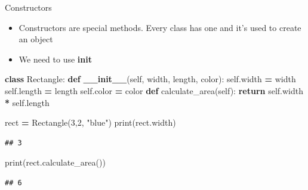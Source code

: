 \documentclass[
  8pt,
  ignorenonframetext,
]{beamer}
\newenvironment{Shaded}{\begin{snugshade}}{\end{snugshade}}
\newcommand{\BuiltInTok}[1]{#1}
\newcommand{\ControlFlowTok}[1]{\textcolor[rgb]{0.13,0.29,0.53}{\textbf{#1}}}
\newcommand{\DecValTok}[1]{\textcolor[rgb]{0.00,0.00,0.81}{#1}}
\newcommand{\FunctionTok}[1]{\textcolor[rgb]{0.13,0.29,0.53}{\textbf{#1}}}
\newcommand{\KeywordTok}[1]{\textcolor[rgb]{0.13,0.29,0.53}{\textbf{#1}}}
\newcommand{\NormalTok}[1]{#1}
\newcommand{\OperatorTok}[1]{\textcolor[rgb]{0.81,0.36,0.00}{\textbf{#1}}}
\newcommand{\StringTok}[1]{\textcolor[rgb]{0.31,0.60,0.02}{#1}}
\newcommand{\VariableTok}[1]{\textcolor[rgb]{0.00,0.00,0.00}{#1}}
\begin{document}
\begin{frame}[fragile]{Constructors}
\protect\hypertarget{constructors}{}
\begin{itemize}
\item
  Constructors are special methods. Every class has one and it's used to
  create an object
\item
  We need to use \textbf{\textbf{init}}
\end{itemize}

\begin{Shaded}
\begin{Highlighting}[]
\KeywordTok{class}\NormalTok{ Rectangle:}
    \KeywordTok{def} \FunctionTok{\_\_init\_\_}\NormalTok{(}\VariableTok{self}\NormalTok{, width, length, color):}
        \VariableTok{self}\NormalTok{.width }\OperatorTok{=}\NormalTok{ width}
        \VariableTok{self}\NormalTok{.length }\OperatorTok{=}\NormalTok{ length}
        \VariableTok{self}\NormalTok{.color }\OperatorTok{=}\NormalTok{ color}
    \KeywordTok{def}\NormalTok{ calculate\_area(}\VariableTok{self}\NormalTok{):}
      \ControlFlowTok{return} \VariableTok{self}\NormalTok{.width }\OperatorTok{*} \VariableTok{self}\NormalTok{.length}
        
\NormalTok{rect }\OperatorTok{=}\NormalTok{ Rectangle(}\DecValTok{3}\NormalTok{,}\DecValTok{2}\NormalTok{, }\StringTok{"blue"}\NormalTok{)}
\BuiltInTok{print}\NormalTok{(rect.width)}
\end{Highlighting}
\end{Shaded}

\begin{verbatim}
## 3
\end{verbatim}

\begin{Shaded}
\begin{Highlighting}[]
\BuiltInTok{print}\NormalTok{(rect.calculate\_area())}
\end{Highlighting}
\end{Shaded}

\begin{verbatim}
## 6
\end{verbatim}
\end{frame}
\end{document}
